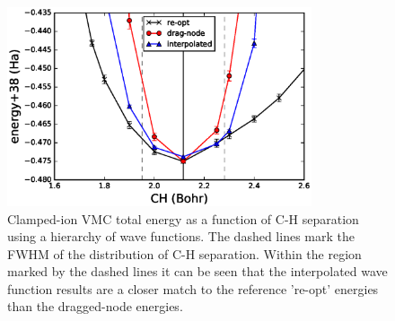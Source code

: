 \begin{figure}[h]
\includegraphics[width=0.8\textwidth]{CH-cold}
\caption{Clamped-ion VMC total energy as a function of C-H separation using a hierarchy of wave functions. The dashed lines mark the FWHM of the distribution of C-H separation.  Within the region marked by the dashed lines it can be seen that the interpolated wave function results are a closer match to the reference 're-opt' energies than the dragged-node energies. \label{fig:ch-cold}}
\end{figure}


